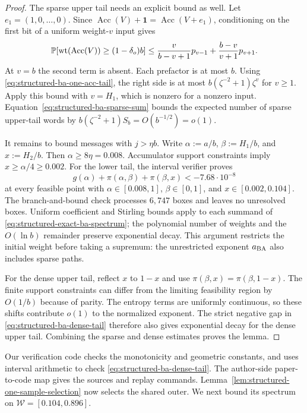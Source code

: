 \begin{proof}
The sparse upper tail needs an explicit bound as well. Let
$e_1=(1,0,\ldots,0)$. Since
$\operatorname{Acc}(V)+\mathbf1=\operatorname{Acc}(V+e_1)$,
conditioning on the first bit of a uniform weight-$v$ input gives
\[
 \mathbb P[\operatorname{wt}(\operatorname{Acc}(V))\ge(1-\delta_o)b]
 \le \frac{v}{b-v+1}p_{v-1}
      +\frac{b-v}{v+1}p_{v+1}.
\]
At $v=b$ the second term is absent. Each prefactor is at most $b$.
Using \eqref{eq:structured-ba-one-acc-tail}, the right side is at most
$b(\zeta^{-2}+1)\zeta^v$ for $v\ge1$.
Apply this bound with $v=H_1$, which is nonzero for a nonzero input.
Equation~\eqref{eq:structured-ba-sparse-sum} bounds the expected number
of sparse upper-tail words by $b(\zeta^{-2}+1)S_b=O(b^{-1/2})=o(1)$.

It remains to bound messages with $j>\eta b$. Write
$\alpha:=a/b$, $\beta:=H_1/b$, and $x:=H_2/b$.
Then $\alpha\ge8\eta=0.008$. Accumulator support constraints imply
$x\ge\alpha/4\ge0.002$. For the lower tail, the interval verifier proves
\begin{equation}
  g(\alpha)+\pi(\alpha,\beta)+\pi(\beta,x)
  <-7.68\cdot10^{-8}
  \label{eq:structured-ba-dense-tail}
\end{equation}
at every feasible point with
$\alpha\in[0.008,1]$, $\beta\in[0,1]$, and $x\in[0.002,0.104]$.
The branch-and-bound check processes $6{,}747$ boxes and leaves no
unresolved boxes. Uniform coefficient and Stirling bounds apply to
each summand of \eqref{eq:structured-exact-ba-spectrum}; the polynomial
number of weights and the $O(\ln b)$ remainder preserve exponential decay.
This argument restricts the initial weight before taking a supremum:
the unrestricted exponent $a_{\rm BA}$ also includes sparse paths.

For the dense upper tail, reflect $x$ to $1-x$ and use
$\pi(\beta,x)=\pi(\beta,1-x)$.
The finite support constraints can differ from the limiting feasibility
region by $O(1/b)$ because of parity. The entropy terms are uniformly
continuous, so these shifts contribute $o(1)$ to the normalized exponent.
The strict negative gap in \eqref{eq:structured-ba-dense-tail} therefore
also gives exponential decay for the dense upper tail.
Combining the sparse and dense estimates proves the lemma.
\end{proof}

Our verification code checks the monotonicity and geometric constants,
and uses interval arithmetic to check \eqref{eq:structured-ba-dense-tail}.
The author-side paper-to-code map gives the sources and replay commands.
Lemma~\ref{lem:structured-one-sample-selection} now selects the shared
outer. We next bound its spectrum on $\mathcal W=[0.104,0.896]$.

